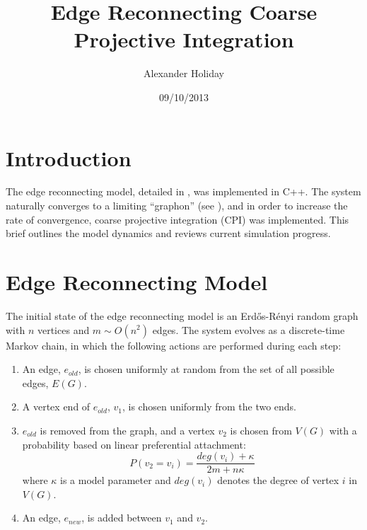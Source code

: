 \documentclass[11pt]{article}
\begin{document}
\title{Edge Reconnecting Coarse Projective Integration}
\author{Alexander Holiday\vspace{-2ex}}
\date{09/10/2013}
\maketitle
\section*{Introduction}
The edge reconnecting model, detailed in \cite{balazs:rsa12}, was implemented in C++. The system naturally converges to a limiting ``graphon'' (see \cite{lovasz:jcombth06}), and in order to increase the rate of convergence, coarse projective integration (CPI) was implemented. This brief outlines the model dynamics and reviews current simulation progress.

\section*{Edge Reconnecting Model}
The initial state of the edge reconnecting model is an Erd\H{o}s-R\'{e}nyi random graph with $n$ vertices and $m\sim O(n^{2})$ edges. The system evolves as a discrete-time Markov chain, in which the following actions are performed during each step:

\begin{enumerate}
\item An edge, $e_{old}$, is chosen uniformly at random from the set of all possible edges, $E(G)$.
\item A vertex end of $e_{old}$, $v_{1}$, is chosen uniformly from the two ends.
\item $e_{old}$ is removed from the graph, and a vertex $v_{2}$ is chosen from $V(G)$ with a probability based on linear preferential attachment:
  \[
  P(v_{2}=v_{i})=\frac{deg(v_{i})+\kappa}{2m+n\kappa}
  \]
where $\kappa$ is a model parameter and $deg(v_{i})$ denotes the degree of vertex $i$ in $V(G)$.
\item An edge, $e_{new}$, is added between $v_{1}$ and $v_{2}$.
\end{enumerate}
\end{document}
